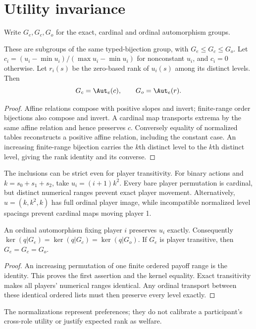 \section{Utility invariance}
Write $G_e,G_c,G_o$ for the exact, cardinal and ordinal automorphism groups.
\begin{proposition}
These are subgroups of the same typed-bijection group, with
$G_e\le G_c\le G_o$. Let $c_i=(u_i-\min u_i)/(\max u_i-\min u_i)$ for
nonconstant $u_i$, and $c_i=0$ otherwise. Let $r_i(s)$ be the zero-based rank
of $u_i(s)$ among its distinct levels. Then
\[
G_c=\Aut_e(c),\qquad G_o=\Aut_e(r).
\]
\end{proposition}
\begin{proof}
Affine relations compose with positive slopes and invert; finite-range order
bijections also compose and invert. A cardinal map transports extrema by the
same affine relation and hence preserves $c$. Conversely equality of normalized
tables reconstructs a positive affine relation, including the constant case.
An increasing finite-range bijection carries the $k$th distinct level to the
$k$th distinct level, giving the rank identity and its converse.
\end{proof}

The inclusions can be strict even for player transitivity. For binary actions
and $k=s_0+s_1+s_2$, take $u_i=(i+1)k^2$. Every bare player permutation is
cardinal, but distinct numerical ranges prevent exact player movement.
Alternatively, $u=(k,k^2,k)$ has full ordinal player image, while incompatible
normalized level spacings prevent cardinal maps moving player 1.

\begin{proposition}
An ordinal automorphism fixing player $i$ preserves $u_i$ exactly. Consequently
$\ker(q|G_e)=\ker(q|G_c)=\ker(q|G_o)$.
If $G_e$ is player transitive, then $G_e=G_c=G_o$.
\end{proposition}
\begin{proof}
An increasing permutation of one finite ordered payoff range is the identity.
This proves the first assertion and the kernel equality. Exact transitivity
makes all players' numerical ranges identical. Any ordinal transport between
these identical ordered lists must then preserve every level exactly.
\end{proof}
The normalizations represent preferences; they do not calibrate a participant's
cross-role utility or justify expected rank as welfare.
